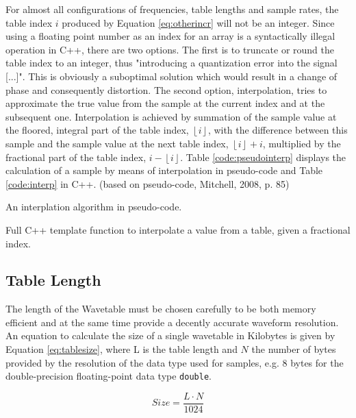   For almost all configurations of frequencies, table lengths and sample rates, the table index $i$ produced by Equation \ref{eq:otherincr} will not be an integer. Since using a floating point number as an index for an array is a syntactically illegal operation in C++, there are two options. The first is to truncate or round the table index to an integer, thus "introducing a quantization error into the signal [...]". This is obviously a suboptimal solution which would result in a change of phase and consequently distortion.  The second option, interpolation, tries to approximate the true value from the sample at the current index and at the subsequent one. Interpolation is achieved by summation of the sample value at the floored, integral part of the table index, $\left \lfloor{i}\right \rfloor$, with the difference between this sample and the sample value at the next table index, $\left \lfloor {i}\right \rfloor + i$, multiplied by the fractional part of the table index, $i - \left \lfloor {i}\right \rfloor$. Table \ref{code:pseudointerp} displays the calculation of a sample by means of interpolation in pseudo-code and Table \ref{code:interp} in C++. (based on pseudo-code, Mitchell, 2008, p. 85)

  \begin{table}
    \caption{An interplation algorithm in pseudo-code.}
    \label{code:pseudointerp}
  \end{table}

  \begin{table}
    \caption{Full C++ template function to interpolate a value from a table, given a fractional index. }
    \label{code:interp}
  \end{table}

  \subsection{Table Length}

  The length of the Wavetable must be chosen carefully to be both memory efficient and at the same time provide a decently accurate waveform resolution. An equation to calculate the size of a single wavetable in Kilobytes is given by Equation \ref{eq:tablesize}, where L is the table length and $N$ the number of bytes provided by the resolution of the data type used for samples, e.g. 8 bytes for the double-precision floating-point data type \texttt{double}.

  \begin{equation}
    Size = \frac{L \cdot N}{1024}
    \label{eq:tablesize}
  \end{equation}

